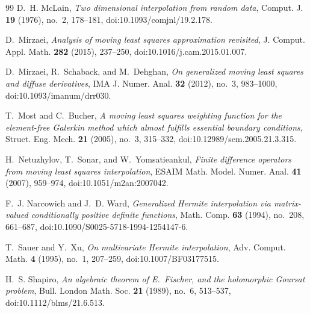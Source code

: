 \documentclass[12pt]{amsart}
\theoremstyle{definition}
\theoremstyle{remark}
\begin{document}
\begin{thebibliography}{99}
D.~H. McLain, \emph{Two dimensional interpolation from random data}, Comput. J. \textbf{19} (1976), no.~2, 178--181, doi:10.1093/comjnl/19.2.178.

D.~Mirzaei, \emph{Analysis of moving least squares approximation revisited}, J. Comput. Appl.
Math. \textbf{282} (2015), 237--250, doi:10.1016/j.cam.2015.01.007.

D.~Mirzaei, R.~Schaback, and M.~Dehghan, \emph{On generalized moving least squares and diffuse derivatives}, IMA J. Numer. Anal. \textbf{32} (2012), no.~3, 983--1000, doi:10.1093/imanum/drr030.

T.~Most and C.~Bucher, \emph{A moving least squares weighting function for the element-free {G}alerkin method which almost fulfills essential boundary conditions}, Struct. Eng. Mech. \textbf{21} (2005), no.~3, 315--332, doi:10.12989/sem.2005.21.3.315.

H.~Netuzhylov, T.~Sonar, and W.~Yomsatieankul, \emph{Finite difference operators from moving
least squares interpolation}, ESAIM Math. Model. Numer. Anal. \textbf{41} (2007), 959--974,
doi:10.1051/m2an:2007042.

F.~J. Narcowich and J.~D. Ward, \emph{Generalized {H}ermite interpolation via matrix-valued conditionally positive definite functions}, Math. Comp. \textbf{63} (1994), no.~208, 661--687, doi:10.1090/S0025-5718-1994-1254147-6.

T.~Sauer and Y.~Xu, \emph{On multivariate {H}ermite interpolation}, Adv. Comput. Math. \textbf{4} (1995), no.~1, 207--259, doi:10.1007/BF03177515.

H.~S. Shapiro, \emph{An algebraic theorem of {E}.~{F}ischer, and the holomorphic {G}oursat problem}, Bull. London Math. Soc. \textbf{21} (1989), no.~6, 513--537, doi:10.1112/blms/21.6.513.


\end{thebibliography}
\end{document}
